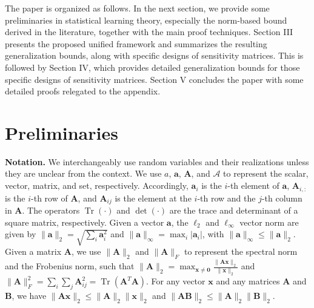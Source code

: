 \documentclass[journal]{IEEEtran} %
\def\vzero{{\bm{0}}}
\def\va{{\bm{a}}}
\def\vx{{\bm{x}}}
\def\mA{{\bm{A}}}
\def\mB{{\bm{B}}}
\def\gA{{\mathcal{A}}}
\newcommand{\Norm}[1]{\|#1\|}
\newcommand{\Abs}[1]{|#1|}
\DeclareMathOperator{\Tr}{Tr}
\begin{document}
The paper is organized as follows. In the next section, we provide some preliminaries in statistical learning theory, especially the norm-based bound derived in the literature, together with the main proof techniques. Section III presents the proposed unified framework and summarizes the resulting generalization bounds, along with specific designs of sensitivity matrices. This is followed by Section IV, which provides detailed generalization bounds for those specific designs of sensitivity matrices. Section V concludes the paper with some detailed proofs relegated to the appendix.


\section{Preliminaries}
\label{gen_inst}

\textbf{Notation.} We interchangeably use random variables and their realizations unless they are unclear from the context. We use $a$, $\va$, $\mA$, and $\gA$ to represent the scalar, vector, matrix, and set, respectively. Accordingly, $\va_i$ is the $i$-th element of $\va$, $\mA_{i,:}$ is the $i$-th row of $\mA$, and $\mA_{ij}$ is the element at the $i$-th row and the $j$-th column in $\mA$. The operators $\Tr(\cdot)$ and $\det(\cdot)$ are the trace and determinant of a square matrix, respectively.
Given a vector $\va$, the $\ell_2$ and $\ell_{\infty}$ vector norm are given by $\Norm{\va}_2=\sqrt{\sum_i \va_i^2}$ and $\Norm{\va}_{\infty}=\max_i \Abs{\va_i}$, with $\Norm{\va}_{\infty} \le \Norm{\va}_2$. Given a matrix $\mA$, we use $\Norm{\mA}_2$ and $\Norm{\mA}_F$ to represent the spectral norm and the Frobenius norm, such that $\Norm{\mA}_2=\max_{\vx \neq \vzero} \frac{\Norm{\mA \vx}_2}{\Norm{\vx}_2}$ and $\Norm{\mA}_F^2=\sum_i \sum_j \mA_{ij}^2 = \Tr(\mA^T\mA)$.
For any vector $\vx$ and any matrices $\mA$ and $\mB$, we have $\Norm{\mA\vx}_2 \le \Norm{\mA}_2 \Norm{\vx}_2$ and $\Norm{\mA \mB}_2 \le \Norm{\mA}_2 \Norm{\mB}_2$.
\end{document}
